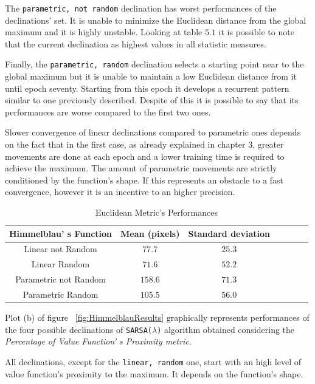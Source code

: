 The {\tt parametric, not random} declination has worst performances of the declinations' set. It is unable to minimize the Euclidean distance from the global maximum and it is highly unstable. Looking at table $5.1$ it is possible to note that the current declination as highest values in all statistic measures.

Finally, the {\tt parametric, random} declination selects a starting point near to the global maximum but it is unable to maintain a low Euclidean distance from it until epoch seventy. Starting from this epoch it develops a recurrent pattern similar to one previously described. Despite of this it is possible to say that its performances are worse compared to the first two ones.

Slower convergence of linear declinations compared to parametric ones depends on the fact that in the first case, as already explained in chapter $3$, greater movements are done at each epoch and a lower training time is required to achieve the maximum. The amount of parametric movements are strictly conditioned by the function's shape. If this represents an obstacle to a fast convergence, however it is an incentive to an higher precision. \\

\begin{table} [h!]
	\centering
	\resizebox{\linewidth}{!} {
	\begin{tabular}{c| cccccc}
		\hline \textbf{Himmelblau' s Function}
		& \textbf{Mean (pixels)} & \textbf{Standard deviation}  \\ 
		\hline Linear not Random
		& $77.7$ &\cellcolor{red!25}$25.3$ \\ 
		\hline Linear Random
		& \cellcolor{red!25}$71.6$ & $52.2$ \\ 
		\hline Parametric not Random
		& $158.6$ & $71.3$ \\ 
		\hline Parametric Random
		& $105.5$ & $56.0$ \\ 
		\hline 
	\end{tabular}
}
\label{tab:HimmelblauTabEuclidean}
\caption{Euclidean Metric's Performances}
\end{table}

Plot (b) of figure ~\ref{fig:HimmelblauResults} graphically represents performances of the four possible declinations of {\tt SARSA($\lambda$)} algorithm obtained considering the \textit{Percentage of Value Function' s Proximity metric}.

All declinations, except for the {\tt linear, random} one, start with an high level of value function's proximity to the maximum. It depends on the function's shape. 

